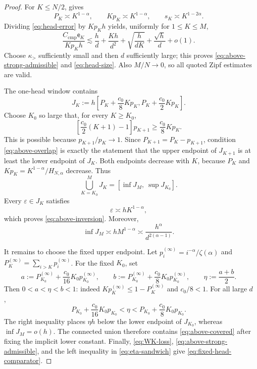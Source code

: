 \documentclass[11pt]{article}
\theoremstyle{definition}
\newcommand{\eps}{\varepsilon}
\begin{document}
\begin{proof}
For $K\leq N/2$,  gives
\[
 P_K\asymp K^{1-\alpha},
 \qquad Kp_K\asymp K^{1-\alpha},
 \qquad s_K\asymp K^{1-2\alpha}.
\]
Dividing \eqref{eq:head-error} by $Kp_Kh$ yields, uniformly for
$1\leq K\leq M$,
\begin{equation}
 \frac{C_{\mathrm{cmp}}\mathsf e_K}{Kp_Kh}
 \lesssim
 \frac hd+\frac{Kh}{d^2}
 +\sqrt{\frac h{dK}}+\frac{\sqrt h}{d}+o(1).
 \label{eq:above-error-ratio}
\end{equation}
Choose $\kappa_>$ sufficiently small and then $d$ sufficiently large;
this proves \eqref{eq:above-strong-admissible} and
\eqref{eq:head-size}.  Also $M/N\to0$, so all quoted Zipf estimates are
valid.

The one-head window contains
\begin{equation}
 J_K:=h\left[
 P_K+\frac{c_0}{8}Kp_K,
 P_K+\frac{c_0}{2}Kp_K
 \right].
 \label{eq:above-JK}
\end{equation}
Choose $K_0$ so large that, for every $K\geq K_0$,
\begin{equation}
 \left[\frac{c_0}{2}(K+1)-1\right]p_{K+1}
 \geq\frac{c_0}{8}Kp_K.
 \label{eq:above-overlap}
\end{equation}
This is possible because $p_{K+1}/p_K\to1$.  Since
$P_{K+1}=P_K-p_{K+1}$, condition \eqref{eq:above-overlap} is exactly the
statement that the upper endpoint of $J_{K+1}$ is at least the lower
endpoint of $J_K$.  Both endpoints decrease with $K$, because
$P_K$ and $Kp_K=K^{1-\alpha}/H_{N,\alpha}$ decrease.  Thus
\[
 \bigcup_{K=K_0}^M J_K
 =\left[\inf J_M,\ \sup J_{K_0}\right].
\]
Every $\eps\in J_K$ satisfies
\begin{equation}
 \eps\asymp hK^{1-\alpha},
 \label{eq:above-window-scale}
\end{equation}
which proves \eqref{eq:above-inversion}.  Moreover,
\[
 \inf J_M\asymp hM^{1-\alpha}
 \asymp \frac{h^\alpha}{d^{2(\alpha-1)}}.
\]

It remains to choose the fixed upper endpoint.  Let
$p_i^{(\infty)}=i^{-\alpha}/\zeta(\alpha)$ and
$P_K^{(\infty)}=\sum_{i>K}p_i^{(\infty)}$.  For the fixed $K_0$, set
\[
 a:=P_{K_0}^{(\infty)}+\frac{c_0}{16}K_0p_{K_0}^{(\infty)},
 \qquad
 b:=P_{K_0}^{(\infty)}+\frac{c_0}{8}K_0p_{K_0}^{(\infty)},
 \qquad
 \eta:=\frac{a+b}{2}.
\]
Then $0<a<\eta<b<1$: indeed
$Kp_K^{(\infty)}\leq1-P_K^{(\infty)}$ and $c_0/8<1$.
For all large $d$,
\begin{equation}
 P_{K_0}+\frac{c_0}{16}K_0p_{K_0}
 <\eta<
 P_{K_0}+\frac{c_0}{8}K_0p_{K_0}.
 \label{eq:eta-sandwich}
\end{equation}
The right inequality places $\eta h$ below the lower endpoint of
$J_{K_0}$, whereas $\inf J_M=o(h)$.  The connected union therefore
contains \eqref{eq:above-covered} after fixing the implicit lower
constant.  Finally, \eqref{eq:WK-loss},
\eqref{eq:above-strong-admissible}, and the left inequality in
\eqref{eq:eta-sandwich} give \eqref{eq:fixed-head-comparator}.
\end{proof}
\end{document}
